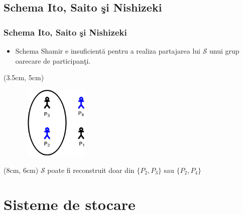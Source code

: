 \documentclass{beamer}
\theoremstyle{definition}
\begin{document}
\subsection{Schema Ito, Saito \c{s}i Nishizeki}
\begin{frame}
    \frametitle{Schema Ito, Saito \c{s}i Nishizeki}

     {
    \begin{itemize}
        \item Schema Shamir e insuficient\u{a} pentru a realiza partajarea lui $\mathcal{S}$ unui grup oarecare de participan\c{t}i.
    \end{itemize}
    }
     {
        \begin{textblock*}{4cm}(3.5cm, 5cm)
            \begin{figure}
                \includegraphics[width=3.5cm,height=3.5cm,keepaspectratio]{img/shamir/Ito.png}
           \end{figure}
        \end{textblock*}
    }
     {

        \begin{textblock*}{4cm}(8cm, 6cm)
            {$\mathcal{S}$ poate fi reconstruit doar din $\{P_2, P_3\}$ sau $\{P_2, P_4\}$}
        \end{textblock*}  
    }
\end{frame}

\section{Sisteme de stocare}
\end{document}
